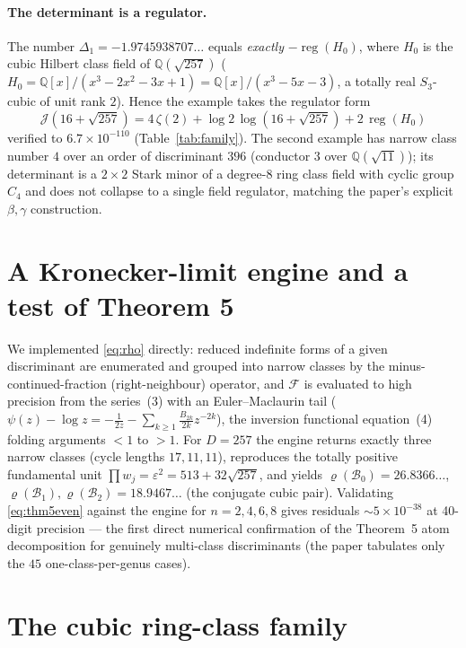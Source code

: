 \documentclass[11pt]{article}
\newcommand{\Jc}{\mathcal{J}}
\newcommand{\Fc}{\mathcal{F}}
\newcommand{\reg}{\operatorname{reg}}
\newcommand{\Q}{\mathbb{Q}}
\newcommand{\rhoB}{\varrho}
\begin{document}
\paragraph{The determinant is a regulator.} The number $\Delta_1=-1.9745938707\ldots$
equals \emph{exactly} $-\reg(H_0)$, where $H_0$ is the cubic Hilbert class field
of $\Q(\sqrt{257})$ ($H_0=\Q[x]/(x^3-2x^2-3x+1)=\Q[x]/(x^3-5x-3)$, a totally
real $S_3$-cubic of unit rank $2$). Hence the example takes the regulator form
\begin{equation}\label{eq:257}
  \boxed{\;\Jc(16+\sqrt{257})=4\,\zeta(2)+\log2\,\log(16+\sqrt{257})+2\,\reg(H_0)\;}
\end{equation}
verified to $6.7\times10^{-110}$ (Table~\ref{tab:family}). The second example
has narrow class number $4$ over an order of discriminant $396$ (conductor $3$
over $\Q(\sqrt{11})$); its determinant is a $2\times2$ Stark minor of a degree-8
ring class field with cyclic group $C_4$ and does not collapse to a single field
regulator, matching the paper's explicit $\beta,\gamma$ construction.

\section{A Kronecker-limit engine and a test of Theorem 5}

We implemented \eqref{eq:rho} directly: reduced indefinite forms of a given
discriminant are enumerated and grouped into narrow classes by the
minus-continued-fraction (right-neighbour) operator, and $\Fc$ is evaluated to
high precision from the series~(3) with an Euler--Maclaurin tail
($\psi(z)-\log z=-\tfrac1{2z}-\sum_{k\ge1}\tfrac{B_{2k}}{2k}z^{-2k}$), the
inversion functional equation~(4) folding arguments $<1$ to $>1$. For
$D=257$ the engine returns exactly three narrow classes (cycle lengths
$17,11,11$), reproduces the totally positive fundamental unit
$\prod w_j=\varepsilon^2=513+32\sqrt{257}$, and yields
$\rhoB(\mathcal B_0)=26.8366\ldots$, $\rhoB(\mathcal B_1),\rhoB(\mathcal B_2)=18.9467\ldots$
(the conjugate cubic pair). Validating \eqref{eq:thm5even} against the engine
for $n=2,4,6,8$ gives residuals $\sim5\times10^{-38}$ at 40-digit precision ---
the first direct numerical confirmation of the Theorem~5 atom decomposition for
genuinely multi-class discriminants (the paper tabulates only the $45$
one-class-per-genus cases).

\section{The cubic ring-class family}
\end{document}
